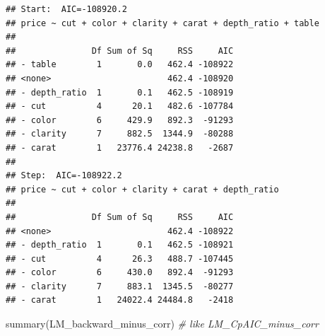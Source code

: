 \documentclass[
]{article}
\newenvironment{Shaded}{\begin{snugshade}}{\end{snugshade}}
\newcommand{\CommentTok}[1]{\textcolor[rgb]{0.56,0.35,0.01}{\textit{#1}}}
\newcommand{\FunctionTok}[1]{\textcolor[rgb]{0.00,0.00,0.00}{#1}}
\newcommand{\NormalTok}[1]{#1}
\begin{document}
\begin{verbatim}
## Start:  AIC=-108920.2
## price ~ cut + color + clarity + carat + depth_ratio + table
##
##               Df Sum of Sq     RSS     AIC
## - table        1       0.0   462.4 -108922
## <none>                       462.4 -108920
## - depth_ratio  1       0.1   462.5 -108919
## - cut          4      20.1   482.6 -107784
## - color        6     429.9   892.3  -91293
## - clarity      7     882.5  1344.9  -80288
## - carat        1   23776.4 24238.8   -2687
##
## Step:  AIC=-108922.2
## price ~ cut + color + clarity + carat + depth_ratio
##
##               Df Sum of Sq     RSS     AIC
## <none>                       462.4 -108922
## - depth_ratio  1       0.1   462.5 -108921
## - cut          4      26.3   488.7 -107445
## - color        6     430.0   892.4  -91293
## - clarity      7     883.1  1345.5  -80277
## - carat        1   24022.4 24484.8   -2418
\end{verbatim}

\begin{Shaded}
\begin{Highlighting}[]
\FunctionTok{summary}\NormalTok{(LM\_backward\_minus\_corr)   }\CommentTok{\# like LM\_CpAIC\_minus\_corr}
\end{Highlighting}
\end{Shaded}
\end{document}
